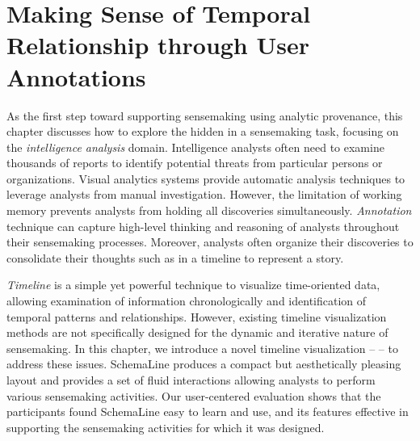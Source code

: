 \chapter{Making Sense of Temporal Relationship through User Annotations}
\label{chap:schemaline}

\graphicspath{{Chapter3/figures/}}

As the first step toward supporting sensemaking using analytic provenance, this chapter discusses how to explore the hidden  in a sensemaking task, focusing on the \emph{intelligence analysis} domain. Intelligence analysts often need to examine thousands of reports to identify potential threats from particular persons or organizations. Visual analytics systems provide automatic analysis techniques to leverage analysts from manual investigation. However, the limitation of working memory prevents analysts from holding all discoveries simultaneously. \emph{Annotation} technique can capture high-level thinking and reasoning of analysts throughout their sensemaking processes. Moreover, analysts often organize their discoveries to consolidate their thoughts such as in a timeline to represent a story.

\emph{Timeline} is a simple yet powerful technique to visualize time-oriented data, allowing examination of information chronologically and identification of temporal patterns and relationships. However, existing timeline visualization methods are not specifically designed for the dynamic and iterative nature of sensemaking. In this chapter, we introduce a novel timeline visualization -- \emph{} -- to address these issues. SchemaLine produces a compact but aesthetically pleasing layout and provides a set of fluid interactions allowing analysts to perform various sensemaking activities. Our user-centered evaluation shows that the participants found SchemaLine easy to learn and use, and its features effective in supporting the sensemaking activities for which it was designed.






